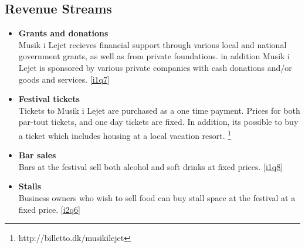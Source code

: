\subsection{Revenue Streams} %
\label{sub:revenue_streams}
\begin{itemize}
	\item \textbf{Grants and donations}\\
	Musik i Lejet recieves financial support through various local and national government grants, as well as from private foundations. in addition Musik i Lejet is sponsored by various private companies with cash donations and/or goods and services. \ref{i1q7}
	\item \textbf{Festival tickets}\\
	Tickets to Musik i Lejet are purchased as a one time payment. Prices for both par-tout tickets, and one day tickets are fixed. In addition, its possible to buy a ticket which includes housing at a local vacation resort. \footnote{http://billetto.dk/musikilejet}
	\item \textbf{Bar sales}\\
	Bars at the festival sell both alcohol and soft drinks at fixed prices. \ref{i1q8}
	\item \textbf{Stalls}\\
	Business owners who wish to sell food can buy stall space at the festival at a fixed price. \ref{i2q6}
\end{itemize}

